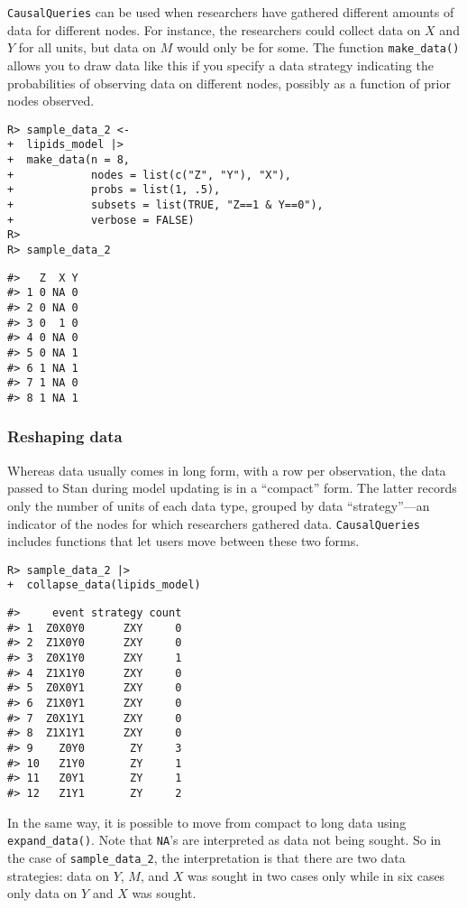 \documentclass[
  11pt,
  article]{jss}
\begin{document}
\texttt{CausalQueries} can be used when researchers have gathered
different amounts of data for different nodes. For instance, the
researchers could collect data on \(X\) and \(Y\) for all units, but
data on \(M\) would only be for some. The function \texttt{make\_data()}
allows you to draw data like this if you specify a data strategy
indicating the probabilities of observing data on different nodes,
possibly as a function of prior nodes observed.

\begin{verbatim}
R> sample_data_2 <-
+  lipids_model |>
+  make_data(n = 8,
+            nodes = list(c("Z", "Y"), "X"),
+            probs = list(1, .5),
+            subsets = list(TRUE, "Z==1 & Y==0"),
+            verbose = FALSE)
R> 
R> sample_data_2
\end{verbatim}

\begin{verbatim}
#>   Z  X Y
#> 1 0 NA 0
#> 2 0 NA 0
#> 3 0  1 0
#> 4 0 NA 0
#> 5 0 NA 1
#> 6 1 NA 1
#> 7 1 NA 0
#> 8 1 NA 1
\end{verbatim}

\subsubsection{Reshaping data}\label{reshaping-data}

Whereas data usually comes in long form, with a row per observation, the
data passed to Stan during model updating is in a ``compact'' form. The
latter records only the number of units of each data type, grouped by
data ``strategy''---an indicator of the nodes for which researchers
gathered data. \texttt{CausalQueries} includes functions that let users
move between these two forms.

\begin{verbatim}
R> sample_data_2 |> 
+  collapse_data(lipids_model)
\end{verbatim}

\begin{verbatim}
#>     event strategy count
#> 1  Z0X0Y0      ZXY     0
#> 2  Z1X0Y0      ZXY     0
#> 3  Z0X1Y0      ZXY     1
#> 4  Z1X1Y0      ZXY     0
#> 5  Z0X0Y1      ZXY     0
#> 6  Z1X0Y1      ZXY     0
#> 7  Z0X1Y1      ZXY     0
#> 8  Z1X1Y1      ZXY     0
#> 9    Z0Y0       ZY     3
#> 10   Z1Y0       ZY     1
#> 11   Z0Y1       ZY     1
#> 12   Z1Y1       ZY     2
\end{verbatim}

In the same way, it is possible to move from compact to long data using
\texttt{expand\_data()}. Note that \texttt{NA}'s are interpreted as data
not being sought. So in the case of \texttt{sample\_data\_2}, the
interpretation is that there are two data strategies: data on \(Y\),
\(M\), and \(X\) was sought in two cases only while in six cases only
data on \(Y\) and \(X\) was sought.
\end{document}

